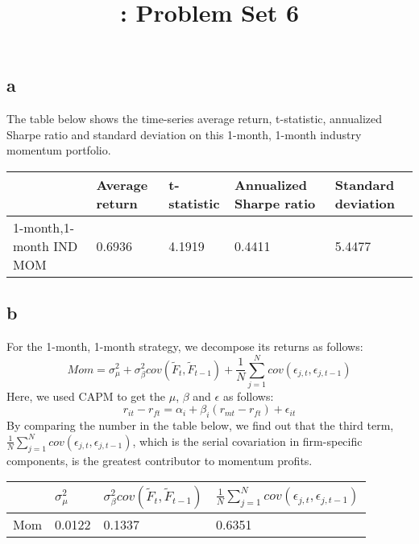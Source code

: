 \documentclass{report}
\title{\LectureTitle: Problem Set 6}
\begin{document}
\maketitle
\newpage

\subsection{a}
The table below shows the time-series average return, t-statistic, annualized Sharpe ratio and standard deviation on this 1-month, 1-month industry momentum portfolio.
\begin{table}[H]
\centering
\begin{tabular}{|l|l|l|l|l|}
\hline
                        & Average return & t-statistic & Annualized Sharpe ratio & Standard deviation \\ \hline
1-month,1-month IND MOM & 0.6936         & 4.1919      & 0.4411                  & 5.4477             \\ \hline
\end{tabular}
\end{table}

\subsection{b}
For the 1-month, 1-month strategy, we decompose its returns as follows:
\[ Mom = \sigma_{\mu}^{2} + \sigma_{\beta}^{2}cov(\tilde{F}_{t},\tilde{F}_{t-1}) + \frac{1}{N}\sum_{j=1}^{N}cov( \epsilon_{j,t},\epsilon_{j,t-1}) \]
Here, we used CAPM to get the $\mu$, $\beta$ and $\epsilon$ as follows:
\[ r_{it}-r_{ft} = \alpha_{i} + \beta_{i}(r_{mt}-r_{ft}) + \epsilon_{it} \]
By comparing the number in the table below, we find out that the third term, $\frac{1}{N}\sum_{j=1}^{N}cov( \epsilon_{j,t},\epsilon_{j,t-1})$, which is the serial covariation in firm-specific components, is the greatest contributor to momentum profits.
\begin{table}[H]
\centering
\begin{tabular}{|l|l|l|l|}
\hline
    & $ \sigma_{\mu}^{2}$ & $ \sigma_{\beta}^{2}cov(\tilde{F}_{t},\tilde{F}_{t-1})$ & $\frac{1}{N}\sum_{j=1}^{N}cov( \epsilon_{j,t},\epsilon_{j,t-1})$ \\ \hline
Mom & 0.0122         & 0.1337      & 0.6351                  \\ \hline
\end{tabular}
\end{table}
\end{document}
